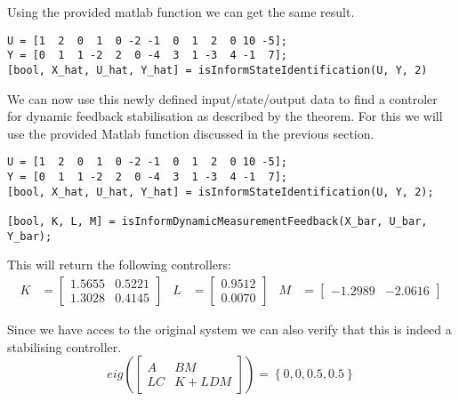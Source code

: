 Using the provided matlab function  we can get the same result.
\begin{lstlisting}
U = [1  2  0  1  0 -2 -1  0  1  2  0 10 -5];
Y = [0  1  1 -2  2  0 -4  3  1 -3  4 -1  7];
[bool, X_hat, U_hat, Y_hat] = isInformStateIdentification(U, Y, 2)
\end{lstlisting}


We can now use this newly defined input/state/output data to find a controler for dynamic feedback stabilisation as described by the theorem. For this we will use the provided Matlab function discussed in the previous section.
\begin{lstlisting}
U = [1  2  0  1  0 -2 -1  0  1  2  0 10 -5];
Y = [0  1  1 -2  2  0 -4  3  1 -3  4 -1  7];
[bool, X_hat, U_hat, Y_hat] = isInformStateIdentification(U, Y, 2);

[bool, K, L, M] = isInformDynamicMeasurementFeedback(X_bar, U_bar, Y_bar);
\end{lstlisting}
This will return the following controllers:
\begin{align*}
K &= \begin{bmatrix} 1.5655&0.5221\\1.3028&0.4145 \end{bmatrix} &
L &= \begin{bmatrix} 0.9512\\0.0070 \end{bmatrix} &
M &= \begin{bmatrix} -1.2989&-2.0616 \end{bmatrix} 
\end{align*}

Since we have acces to the original system we can also verify that this is indeed a stabilising controller.
\[ eig\left( \begin{bmatrix} A & BM \\ LC & K + LDM \end{bmatrix} \right)  = \left\{ 0,0,0.5,0.5 \right\}\]
